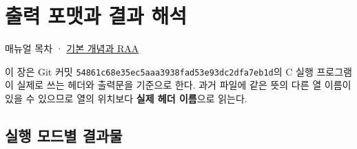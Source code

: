 \chapter{출력 포맷과 결과 해석}
\label{chap:05_output_formats}
매뉴얼 목차 · \hyperref[chap:01_concepts_geometry]{기본 개념과 RAA}

이 장은 Git 커밋 \texttt{54861c68e35ec5aa\allowbreak{}a3938fad53e93dc2\allowbreak{}dfa7eb1d}의 C 실행 프로그램이 실제로 쓰는 헤더와 출력문을 기준으로 한다. 과거 파일에 같은 뜻의 다른 열 이름이 있을 수 있으므로 열의 위치보다 \textbf{실제 헤더 이름}으로 읽는다.

\section{실행 모드별 결과물}
\label{sec:auto:05_output_formats:1}


